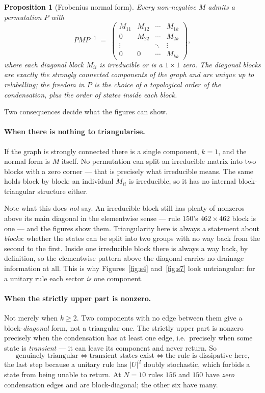 \documentclass[11pt]{article}
\theoremstyle{plain}
\newtheorem{proposition}{Proposition}
\theoremstyle{definition}
\begin{document}
\begin{proposition}[Frobenius normal form]
Every non-negative $M$ admits a permutation $P$ with
\[
PMP^{-1}\;=\;\begin{pmatrix}
M_{11} & M_{12} & \cdots & M_{1k}\\
0 & M_{22} & \cdots & M_{2k}\\
\vdots & & \ddots & \vdots\\
0 & 0 & \cdots & M_{kk}
\end{pmatrix},
\]
where each diagonal block $M_{ii}$ is irreducible or is a $1\times1$ zero. The
diagonal blocks are exactly the strongly connected components of the graph and
are unique up to relabelling; the freedom in $P$ is the choice of a topological
order of the condensation, plus the order of states inside each block.
\end{proposition}

\noindent Two consequences decide what the figures can show.

\paragraph{When there is nothing to triangularise.} If the graph is strongly
connected there is a single component, $k=1$, and the normal form is $M$ itself.
No permutation can split an irreducible matrix into two blocks with a zero
corner --- that is precisely what irreducible means. The same holds block by
block: an individual $M_{ii}$ is irreducible, so it has no internal
block-triangular structure either.

Note what this does \emph{not} say. An irreducible block still has plenty of
nonzeros above its main diagonal in the elementwise sense --- rule $150$'s
$462\times462$ block is one --- and the figures show them. Triangularity here is
always a statement about \emph{blocks}: whether the states can be split into two
groups with no way back from the second to the first. Inside one irreducible
block there is always a way back, by definition, so the elementwise pattern above
the diagonal carries no drainage information at all. This is why
Figures~\ref{fig:s4} and~\ref{fig:s7} look untriangular: for a unitary rule
each sector \emph{is} one component.

\paragraph{When the strictly upper part is nonzero.} Not merely when $k\ge2$.
Two components with no edge between them give a block-\emph{diagonal} form, not
a triangular one. The strictly upper part is nonzero precisely when the
condensation has at least one edge, i.e.\ precisely when some state is
\emph{transient} --- it can leave its component and never return. So
\[
\text{genuinely triangular}\iff\text{transient states exist}\iff\text{the rule is
dissipative here,}
\]
the last step because a unitary rule has $|U|^2$ doubly stochastic, which forbids
a state from being unable to return. At $N=10$ rules $156$ and $150$ have
\emph{zero} condensation edges and are block-diagonal; the other six have many.
\end{document}
